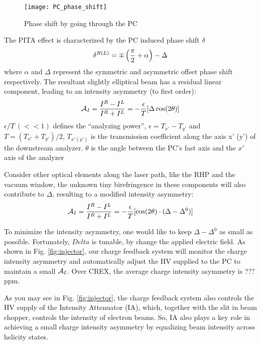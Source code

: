 \begin{figure}[h!]
    \centering
    \texttt{[image: PC\_phase\_shift]}
    \caption{Phase shift by going through the PC}
    \label{fig:pc_phase_shift}
\end{figure}

The PITA effect is characterized by the PC induced phase shift $\delta$
\begin{equation*}
    \delta^{R(L)} = \mp\left(\frac{\pi}{2} + \alpha \right) - \Delta \\
\end{equation*}
where $\alpha$ and $\Delta$ represent the symmetric and asymmetric offset phase
shift respectively. The resultant slightly elliptical beam has a residual
linear component, leading to an intensity asymmetry (to first order):
\begin{equation}
    \mathcal{A}_{I} = \frac{I^R - I^L}{I^R + I^L} = -\frac{\epsilon}{T}[\Delta\cos(2\theta)]	\\
\end{equation}
$\epsilon/T \ (<<1)$ defines the ``analyzing power'', $\epsilon = T_{x'} - T_{y'}$ 
and $T = (T_{x'} + T_{y'})/2$,
$T_{x' (y')}$ is the transmission coefficient along the axis x' (y') of the
downstream analyzer. $\theta$ is the angle between the PC's fast axis and the 
$x'$ axis of the analyzer

Consider other optical elements along the laser path, like the RHP and the vacuum
window, the unknown tiny birefringence in these components will also contribute to $\Delta$,
resulting to a modified intensity asymmetry:
\begin{equation}
    \mathcal{A}_{I} = \frac{I^R - I^L}{I^R + I^L} = -\frac{\epsilon}{T}[\cos(2\theta)\cdot(\Delta - \Delta^0)]	\\
\end{equation}

To minimize the intensity asymmetry, one would like to keep $\Delta - \Delta^0$
as small as possible. Fortunately, $Delta$ is tunable, by change the applied
electric field. As shown in Fig. \ref{fig:injector}, our charge feedback system
will monitor the charge intensity asymmetry and automatically adjust the HV 
supplied to the PC to maintain a small $\mathcal{A}_I$. Over CREX, the average charge
intensity asymmetry is ??? ppm.

As you may see in Fig. \ref{fig:injector}, the charge feedback system also
controls the HV supply of the Intensity Attenuator (IA), which, together with
the slit in beam chopper, controls the intensity of electron beams. So, IA also
plays a key role in achieving a small charge intensity asymmetry by equalizing
beam intensity across helicity states.

